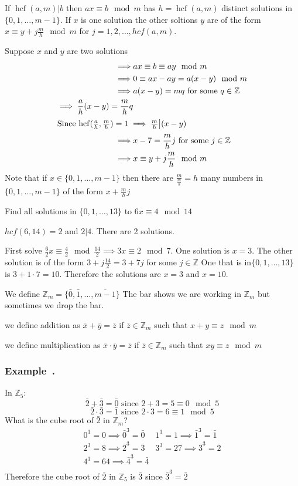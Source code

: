 \documentclass{article}
\newcommand{\bb}[1]{\mathbb{#1}}
\newcommand{\hcf}{\operatorname{hcf}}
\newcounter{example}[section]
\newenvironment{example}[1][]{\refstepcounter{example}\vspace{-0.2cm}
\subsubsection*{Example~\thesection.\theexample} \rmfamily}{\par}
\begin{document}
If \(\hcf(a,m)|b\) then \(ax\equiv b\mod m\) has \(h=\hcf(a,m)\) distinct solutions in \(\{0,1,\dotsc,m-1\}\). If \(x\) is one solution the other soltions \(y\) are of the form \(x\equiv y+j\frac mh\mod m\) for \(j=1,2,\dotsc,hcf(a,m)\).

Suppose \(x\) and \(y\) are two solutions
\begin{align*}
\implies &ax\equiv b\equiv ay\mod m\\
\implies &0\equiv ax-ay=a(x-y)\mod m\\
\implies &a(x-y)=mq\text{ for some }q\in\bb Z\\
\implies\frac ah(x-y)=\frac mh q\\
\intertext{Since \(\hcf(\frac ah,\frac mh)=1\implies \frac mh\big|(x-y)\)}
\implies &x-7=\frac mh j\text{ for some } j\in\bb Z\\
\implies &x\equiv y+j\frac mh\mod m
\end{align*}
Note that if \(x\in\{0,1,\dotsc,m-1\}\) then there are \(\frac{m}{\frac{m}{h}}=h\) many numbers in \(\{0,1,\dotsc, m-1\}\) of the form \(x+\frac mh j\)

Find all solutions in \(\{0,1,\dotsc, 13\}\) to \(6x\equiv 4\mod 14\)

\(hcf(6,14)=2\) and \(2|4\). There are 2 solutions.

First solve \(\frac 62 x\equiv\frac 42\mod\frac{14}{2}\implies3x\equiv 2\mod 7\). One solution is \(x=3\). The other solution is of the form \(3+j\frac{14}{2}=3+7j\) for some \(j\in\bb Z\) One that is in\(\{0,1,\dotsc,13\}\) is \(3+1\cdot7=10\). Therefore the solutions are \(x=3\) and \(x=10\).

We define \(\bb Z_m=\{\bar 0,\bar 1,\dotsc,\overline{m-1}\}\) The bar shows we are working in \(\bb Z_m\) but sometimes we drop the bar.

we define addition as \(\bar x+\bar y=\bar z\) if \(\bar z\in\bb Z_m\) such that \(x+y\equiv z\mod m\)

we define multiplication as \(\bar x\cdot\bar y=\bar z\) if \(\bar z\in\bb Z_m\) such that \(xy\equiv z\mod m\)

\begin{example}
In \(\bb Z_5\):
\[\bar 2+\bar 3=\bar0\text{ since } 2+3=5\equiv0\mod 5\]
\[\bar2\cdot\bar 3=\bar 1\text{ since } 2\cdot 3=6\equiv1 \mod 5\]
What is the cube root of \(\bar 2\) in \(\bb Z_m\)?
\[
\begin{array}{cc}
0^3=0\implies\bar 0^3=\bar 0 & 1^3 = 1\implies\bar 1^3=\bar 1\\
2^3=8\implies\bar 2^3=\bar3 & 3^3 = 27\implies\bar 3^3=\bar 2\\
4^3=64\implies\bar 4^3=\bar 4 & \\
\end{array}
\]
Therefore the cube root of \(\bar 2\)  in \(\bb Z_5\) is \(\bar 3\) since \(\bar 3^3=\bar 2\)
\end{example}
\end{document}
